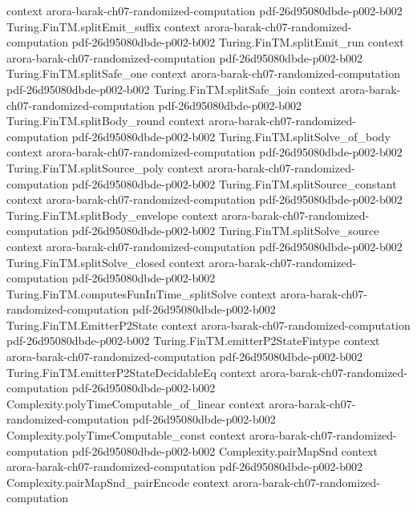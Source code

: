 \begin{theorem}
  {context}
  {arora-barak-ch07-randomized-computation}
  {pdf-26d95080dbde-p002-b002}
\proofstep
  {Turing.FinTM.splitEmit_suffix}
  {context}
  {arora-barak-ch07-randomized-computation}
  {pdf-26d95080dbde-p002-b002}
\proofstep
  {Turing.FinTM.splitEmit_run}
  {context}
  {arora-barak-ch07-randomized-computation}
  {pdf-26d95080dbde-p002-b002}
\proofstep
  {Turing.FinTM.splitSafe_one}
  {context}
  {arora-barak-ch07-randomized-computation}
  {pdf-26d95080dbde-p002-b002}
\proofstep
  {Turing.FinTM.splitSafe_join}
  {context}
  {arora-barak-ch07-randomized-computation}
  {pdf-26d95080dbde-p002-b002}
\proofstep
  {Turing.FinTM.splitBody_round}
  {context}
  {arora-barak-ch07-randomized-computation}
  {pdf-26d95080dbde-p002-b002}
\proofstep
  {Turing.FinTM.splitSolve_of_body}
  {context}
  {arora-barak-ch07-randomized-computation}
  {pdf-26d95080dbde-p002-b002}
\proofstep
  {Turing.FinTM.splitSource_poly}
  {context}
  {arora-barak-ch07-randomized-computation}
  {pdf-26d95080dbde-p002-b002}
\proofstep
  {Turing.FinTM.splitSource_constant}
  {context}
  {arora-barak-ch07-randomized-computation}
  {pdf-26d95080dbde-p002-b002}
\proofstep
  {Turing.FinTM.splitBody_envelope}
  {context}
  {arora-barak-ch07-randomized-computation}
  {pdf-26d95080dbde-p002-b002}
\proofstep
  {Turing.FinTM.splitSolve_source}
  {context}
  {arora-barak-ch07-randomized-computation}
  {pdf-26d95080dbde-p002-b002}
\proofstep
  {Turing.FinTM.splitSolve_closed}
  {context}
  {arora-barak-ch07-randomized-computation}
  {pdf-26d95080dbde-p002-b002}
\proofstep
  {Turing.FinTM.computesFunInTime_splitSolve}
  {context}
  {arora-barak-ch07-randomized-computation}
  {pdf-26d95080dbde-p002-b002}
\proofstep
  {Turing.FinTM.EmitterP2State}
  {context}
  {arora-barak-ch07-randomized-computation}
  {pdf-26d95080dbde-p002-b002}
\proofstep
  {Turing.FinTM.emitterP2StateFintype}
  {context}
  {arora-barak-ch07-randomized-computation}
  {pdf-26d95080dbde-p002-b002}
\proofstep
  {Turing.FinTM.emitterP2StateDecidableEq}
  {context}
  {arora-barak-ch07-randomized-computation}
  {pdf-26d95080dbde-p002-b002}
\proofstep
  {Complexity.polyTimeComputable_of_linear}
  {context}
  {arora-barak-ch07-randomized-computation}
  {pdf-26d95080dbde-p002-b002}
\proofstep
  {Complexity.polyTimeComputable_const}
  {context}
  {arora-barak-ch07-randomized-computation}
  {pdf-26d95080dbde-p002-b002}
\proofstep
  {Complexity.pairMapSnd}
  {context}
  {arora-barak-ch07-randomized-computation}
  {pdf-26d95080dbde-p002-b002}
\proofstep
  {Complexity.pairMapSnd_pairEncode}
  {context}
  {arora-barak-ch07-randomized-computation}

\end{theorem}
